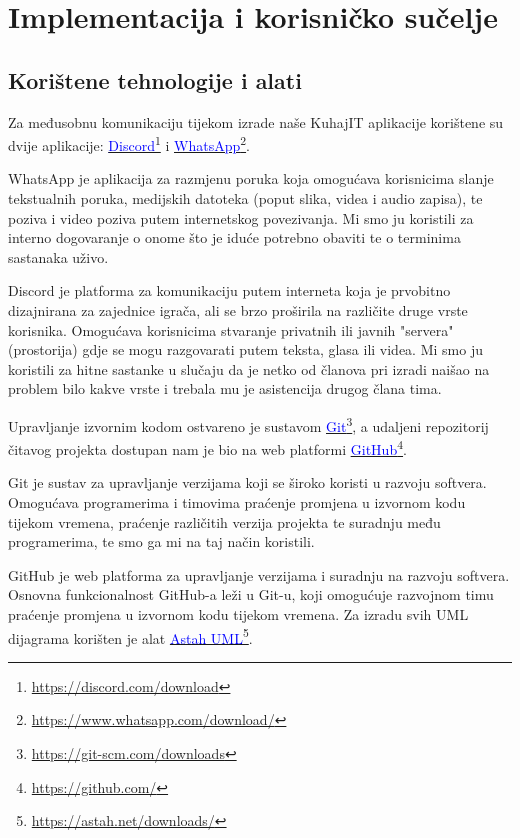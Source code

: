 \chapter{Implementacija i korisničko sučelje}
		
		
		\section{Korištene tehnologije i alati}
		
			 Za međusobnu komunikaciju tijekom izrade naše KuhajIT aplikacije korištene su dvije aplikacije: \textcolor{blue}{\underline{\href{https://discord.com/download}{\textcolor{blue}{Discord}}}}\footnote{\url{https://discord.com/download}} i \textcolor{blue}{\underline{\href{https://www.whatsapp.com/download/}{\textcolor{blue}{WhatsApp}}}}\footnote{\url{https://www.whatsapp.com/download/}}.
			 		 
WhatsApp je aplikacija za razmjenu poruka koja omogućava korisnicima slanje tekstualnih poruka, medijskih datoteka (poput slika, videa i audio zapisa), te poziva i video poziva putem internetskog povezivanja. Mi smo ju koristili za interno dogovaranje o onome što je iduće potrebno obaviti te o terminima sastanaka uživo.

Discord je platforma za komunikaciju putem interneta koja je prvobitno dizajnirana za zajednice igrača, ali se brzo proširila na različite druge vrste korisnika. Omogućava korisnicima stvaranje privatnih ili javnih "servera" (prostorija) gdje se mogu razgovarati putem teksta, glasa ili videa. Mi smo ju koristili za hitne sastanke u slučaju da je netko od članova pri izradi naišao na problem bilo kakve vrste i trebala mu je asistencija drugog člana tima.

Upravljanje izvornim kodom ostvareno je sustavom \textcolor{blue}{\underline{\href{https://git-scm.com/downloads}{\textcolor{blue}{Git}}}}\footnote{\url{https://git-scm.com/downloads}}, a udaljeni repozitorij
čitavog projekta dostupan nam je bio na web platformi \textcolor{blue}{\underline{\href{https://github.com/}{\textcolor{blue}{GitHub}}}}\footnote{\url{https://github.com/}}.

			Git je sustav za upravljanje verzijama koji se široko koristi u razvoju softvera. Omogućava programerima i timovima praćenje promjena u izvornom kodu tijekom vremena, praćenje različitih verzija projekta te suradnju među programerima, te smo ga mi na taj način koristili.
			
			GitHub je web platforma za upravljanje verzijama i suradnju na razvoju softvera. Osnovna funkcionalnost GitHub-a leži u Git-u, koji omogućuje razvojnom timu praćenje promjena u izvornom kodu tijekom vremena. 
			Za izradu svih UML dijagrama korišten je alat \textcolor{blue}{\underline{\href{https://astah.net/downloads/}{\textcolor{blue}{Astah UML}}}}\footnote{\url{https://astah.net/downloads/}}.
			
